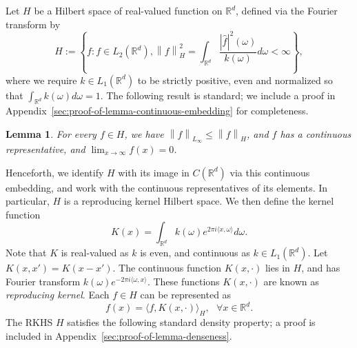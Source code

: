 \documentclass[sn-mathphys-num]{sn-jnl}%
\numberwithin{equation}{section}
\newcommand{\R}{\mathbb{R}}
\newcommand{\kernel}{K}
\newcommand{\norm}[1]{\left\|{#1}\right\|} %
\newtheorem{lemma}{Lemma}
\theoremstyle{thmstyleone}%
\theoremstyle{thmstyletwo}%
\theoremstyle{thmstylethree}%
\begin{document}
Let $H$ be a Hilbert space of real-valued function on $\R^d$, defined via the Fourier 
transform by 
\begin{equation}
\label{eqn:Hilbert-space-construction}
	H := \left\{f: f \in  L_2(\R^d), 
		\norm{f}_H^2 = \int_{\R^d} \frac{|\hat{f}|^2(\omega)}{k(\omega)} d\omega < \infty\right\},
\end{equation}
where we require $k \in L_1(\R^d)$ to be strictly positive, even and normalized so that $\int_{\R^d} k(\omega) d\omega = 1$.
The following result is standard; we include a proof in Appendix~\ref{sec:proof-of-lemma-continuous-embedding} for completeness.
\vspace{.5em} 
\begin{lemma}
\label{lemma:continuous-embedding}
For every $f \in H$, we have $\norm{f}_{L_\infty} \le \norm{f}_H$, and $f$ has a continuous representative, and $\lim_{x \to \infty} f(x) = 0$.
\end{lemma} 

\vspace{.5em} 
Henceforth, we identify $H$ with its image in $C(\R^d)$ via this continuous embedding, and work with the continuous representatives of its elements. In particular, $H$ is a reproducing kernel Hilbert space. We then define the kernel function 
\begin{equation*}
	\kernel(x) = \int_{\R^d} k(\omega) e^{2\pi i \langle x, \omega\rangle} d\omega.
\end{equation*} 
Note that $\kernel$ is real-valued as $k$ is even, and continuous as $k \in L_1(\R^d)$. 
Let $\kernel(x, x') = \kernel(x-x')$.
The continuous function $\kernel(x, \cdot)$ lies in $H$, and has Fourier transform 
$k(\omega) e^{-2\pi i\langle \omega, x\rangle}$. These functions $\kernel(x, \cdot)$ 
are known as \emph{reproducing kernel}. Each $f \in H$ can be represented as 
\begin{equation*}
	f(x) = \langle f, \kernel(x, \cdot)\rangle_H,~~~\forall x\in \R^d.
\end{equation*}
The RKHS $H$ satisfies the following standard density property; a proof is included in
Appendix~\ref{sec:proof-of-lemma-denseness}.
\end{document}
